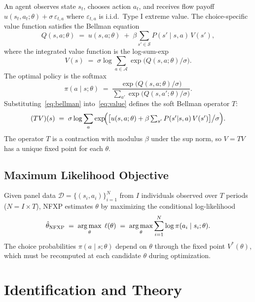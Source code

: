 \documentclass[11pt]{article}
\begin{document}
An agent observes state $s_t$, chooses action $a_t$, and receives flow payoff $u(s_t, a_t; \theta) + \sigma\,\varepsilon_{t,a}$ where $\varepsilon_{t,a}$ is i.i.d.\ Type I extreme value.
The choice-specific value function satisfies the Bellman equation
\begin{equation}
\label{eq:bellman}
Q(s,a;\theta) \;=\; u(s,a;\theta) \;+\; \beta \sum_{s' \in \mathcal{S}} P(s' \mid s,a)\, V(s'),
\end{equation}
where the integrated value function is the log-sum-exp
\begin{equation}
\label{eq:value}
V(s) \;=\; \sigma \log \sum_{a \in \mathcal{A}} \exp\!\bigl(Q(s,a;\theta)/\sigma\bigr).
\end{equation}
The optimal policy is the softmax
\begin{equation}
\label{eq:policy}
\pi(a \mid s;\theta) \;=\; \frac{\exp\!\bigl(Q(s,a;\theta)/\sigma\bigr)}{\sum_{a'} \exp\!\bigl(Q(s,a';\theta)/\sigma\bigr)}.
\end{equation}
Substituting~\eqref{eq:bellman} into~\eqref{eq:value} defines the soft Bellman operator $T$:
\begin{equation}
\label{eq:bellman_op}
(TV)(s) \;=\; \sigma \log \sum_{a} \exp\!\Bigl(\bigl[u(s,a;\theta) + \beta \textstyle\sum_{s'} P(s'|s,a)\,V(s')\bigr]\big/\sigma\Bigr).
\end{equation}
The operator $T$ is a contraction with modulus $\beta$ under the sup norm, so $V = TV$ has a unique fixed point for each $\theta$.

\subsection{Maximum Likelihood Objective}

Given panel data $\mathcal{D} = \{(s_i, a_i)\}_{i=1}^N$ from $I$ individuals observed over $T$ periods ($N = I \times T$), NFXP estimates $\theta$ by maximizing the conditional log-likelihood
\begin{equation}
\label{eq:mle}
\hat\theta_{\text{NFXP}} \;=\; \operatorname*{arg\,max}_\theta \;\ell(\theta) \;=\; \operatorname*{arg\,max}_\theta \sum_{i=1}^{N} \log \pi(a_i \mid s_i; \theta).
\end{equation}
The choice probabilities $\pi(a \mid s; \theta)$ depend on $\theta$ through the fixed point $V^*(\theta)$, which must be recomputed at each candidate $\theta$ during optimization.

\section{Identification and Theory}
\end{document}
